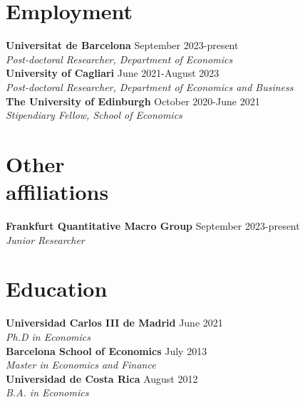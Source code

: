 \documentclass[margin]{res} %
\begin{document}
\begin{resume}

 
\section{Employment}
{\bf Universitat de Barcelona} \hfill September 2023-present  \\
{\sl Post-doctoral Researcher, Department of Economics} \\
{\bf University of Cagliari} \hfill June 2021-August 2023  \\
{\sl Post-doctoral Researcher, Department of Economics and Business} \\
{\bf The University of Edinburgh} \hfill October 2020-June 2021  \\
{\sl Stipendiary Fellow, School of Economics} 


\section{Other \\ affiliations}
{\bf Frankfurt Quantitative Macro Group} \hfill September 2023-present  \\
{\sl Junior Researcher} 


\section{Education}
{\bf Universidad Carlos III de Madrid} \hfill June 2021  \\
{\sl Ph.D in Economics} \\
{\bf Barcelona School of Economics} \hfill July 2013 \\
{\sl Master in Economics and Finance}  \\
{\bf Universidad de Costa Rica} \hfill August 2012 \\
{\sl B.A. in Economics}


\end{resume}
\end{document}

